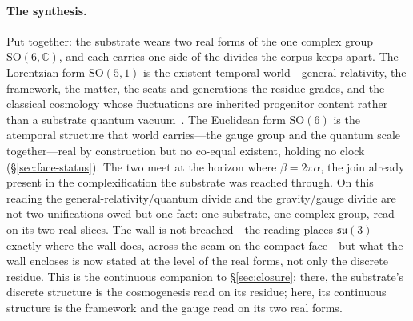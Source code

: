 \documentclass[11pt]{article}
\theoremstyle{plain}
\theoremstyle{remark}
\newcommand{\su}{\mathfrak{su}}
\newcommand{\SO}{\mathrm{SO}}
\begin{document}
\paragraph{The synthesis.} Put together: the substrate wears two real forms of the one complex group $\SO(6,\mathbb{C})$, and each carries one side of the divides the corpus keeps apart. The Lorentzian form $\SO(5,1)$ is the existent temporal world---general relativity, the framework, the matter, the seats and generations the residue grades, and the classical cosmology whose fluctuations are inherited progenitor content rather than a substrate quantum vacuum~\cite{JanzenCRcosmology}. The Euclidean form $\SO(6)$ is the atemporal structure that world carries---the gauge group and the quantum scale together---real by construction but no co-equal existent, holding no clock (\S\ref{sec:face-status}). The two meet at the horizon where $\beta=2\pi\alpha$, the join already present in the complexification the substrate was reached through. On this reading the general-relativity/quantum divide and the gravity/gauge divide are not two unifications owed but one fact: one substrate, one complex group, read on its two real slices. The wall is not breached---the reading places $\su(3)$ exactly where the wall does, across the seam on the compact face---but what the wall encloses is now stated at the level of the real forms, not only the discrete residue. This is the continuous companion to \S\ref{sec:closure}: there, the substrate's discrete structure is the cosmogenesis read on its residue; here, its continuous structure is the framework and the gauge read on its two real forms.
\end{document}
